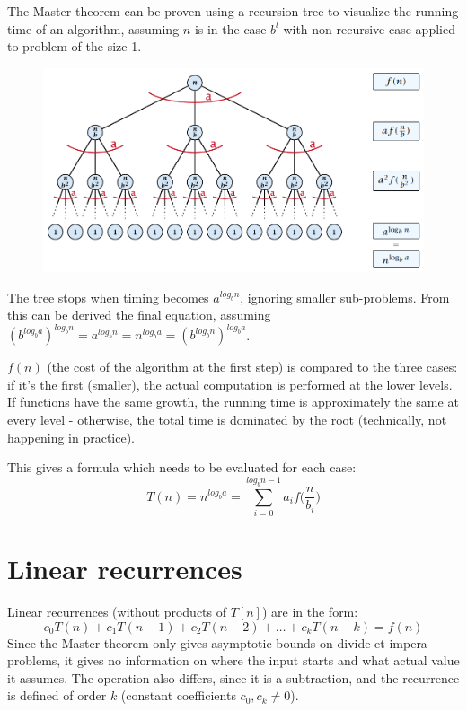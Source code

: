 The Master theorem can be proven using a recursion tree to visualize the running time of an algorithm, assuming $n$ is in the case $b^l$ with non-recursive case applied to problem of the size 1. 

\begin{figure}[h]
	\centering
	\includegraphics[scale=0.43]{lectures/images/master_tree.png}
\end{figure}

The tree stops when timing becomes $a^{log_bn}$, ignoring smaller sub-problems. From this can be derived the final equation, assuming $(b^{log_ba})^{log_bn} = a^{log_bn} = n^{log_ba} = (b^{log_bn})^{log_ba}$.

$f(n)$ (the cost of the algorithm at the first step) is compared to the three cases: if it's the first (smaller), the actual computation is performed at the lower levels. If functions have the same growth, the running time is approximately the same at every level - otherwise, the total time is dominated by the root (technically, not happening in practice). 

This gives a formula which needs to be evaluated for each case: 
$$T(n) = n^{log_ba} = \sum_{i=0}^{log_bn-1}a_if \Big( \frac{n}{b_i} \Big)$$

\section{Linear recurrences}
Linear recurrences (without products of $T[n]$) are in the form:
$$c_0T(n) + c_1T(n-1) + c_2T(n-2) + \dots + c_kT(n-k) = f(n)$$
Since the Master theorem only gives asymptotic bounds on divide-et-impera problems, it gives no information on where the input starts and what actual value it assumes. The operation also differs, since it is a subtraction, and the recurrence is defined of order $k$ (constant coefficients $c_0, c_k \neq 0$). 


